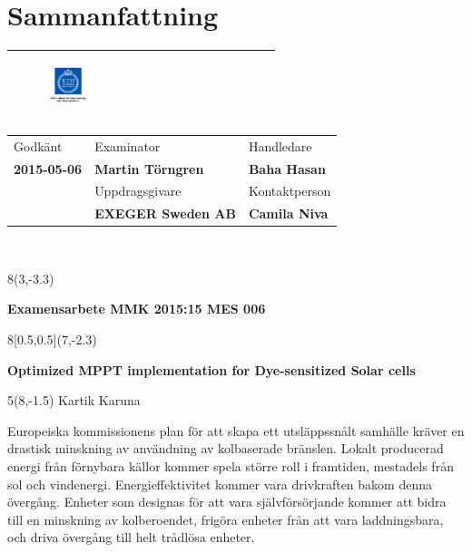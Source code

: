 \chapter*{Sammanfattning}
\thispagestyle{begin}

\begin{tabular}{ | p{\dimexpr \linewidth-2\tabcolsep} |} \hline
 \begin{figure}[H]
        
        \includegraphics[width=0.2\textwidth]{images/indust} 
             \end{figure}  \\\hline
\end{tabular}   
\begin{tabular}{ | p{} |
                  p{} |
                  p{} |} \hline
                 Godkänt & Examinator & Handledare \\
                  \textbf{2015-05-06}  & \textbf{Martin Törngren} & \textbf{Baha Hasan} \\\hline
                   & Uppdragsgivare & Kontaktperson \\
                   & \textbf{EXEGER Sweden AB} & \textbf{Camila Niva}\\ \hline
\end{tabular} \\
\begin{textblock}{8}(3,-3.3)
\begin{center}
\textbf{Examensarbete MMK 2015:15 MES 006 }
\end{center}
\end{textblock}
\begin{textblock}{8}[0.5,0.5](7,-2.3)
\begin{center}
\textbf{Optimized MPPT implementation for Dye-sensitized Solar cells}
\end{center}
\end{textblock}
\begin{textblock}{5}(8,-1.5)
Kartik Karuna
\end{textblock}
Europeiska kommissionens plan för att skapa ett utsläppssnålt samhälle kräver en drastisk minskning av användning av kolbaserade bränslen. Lokalt producerad energi från förnybara källor kommer spela större roll i framtiden, mestadels från sol och vindenergi. Energieffektivitet kommer vara drivkraften bakom denna övergång. Enheter som designas för att vara självförsörjande kommer att  bidra till en minskning av kolberoendet, frigöra enheter från att vara laddningsbara, och driva övergång till helt trådlösa enheter.\\

